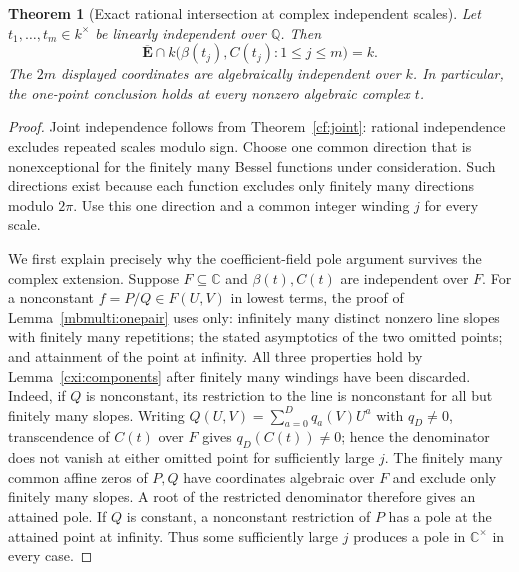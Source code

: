 \documentclass[11pt]{article}
\newtheorem{theorem}{Theorem}[section]
\theoremstyle{definition}
\theoremstyle{remark}
\newcommand{\Ebar}{\overline{\mathbf E}}
\begin{document}
\begin{theorem}[Exact rational intersection at complex independent scales]
\label{cxi:main}
Let $t_1,\ldots,t_m\in k^\times$ be linearly independent over
$\mathbb Q$.  Then
\[
 \boxed{\quad
 \Ebar\cap k\bigl(\beta(t_j),C(t_j):1\le j\le m\bigr)=k.
 \quad}
\]
The $2m$ displayed coordinates are algebraically independent over $k$.
In particular, the one-point conclusion holds at every nonzero
algebraic complex $t$.
\end{theorem}

\begin{proof}
Joint independence follows from Theorem~\ref{cf:joint}: rational
independence excludes repeated scales modulo sign.  Choose one common
direction that is nonexceptional for the finitely many Bessel functions
under consideration.  Such directions exist because each function
excludes only finitely many directions modulo $2\pi$.  Use this one
direction and a common integer winding $j$ for every scale.

We first explain precisely why the coefficient-field pole argument
survives the complex extension.  Suppose $F\subseteq\mathbb C$ and
$\beta(t),C(t)$ are independent over $F$.  For a nonconstant
$f=P/Q\in F(U,V)$ in lowest terms, the proof of
Lemma~\ref{mbmulti:onepair} uses only: infinitely many distinct nonzero
line slopes with finitely many repetitions; the stated asymptotics of
the two omitted points; and attainment of the point at infinity.
All three properties hold by Lemma~\ref{cxi:components} after finitely
many windings have been discarded.  Indeed, if $Q$ is nonconstant,
its restriction to the line is nonconstant for all but finitely many
slopes.  Writing $Q(U,V)=\sum_{a=0}^Dq_a(V)U^a$ with $q_D\ne0$,
transcendence of $C(t)$ over $F$ gives $q_D(C(t))\ne0$; hence the
denominator does not vanish at either omitted point for sufficiently
large $j$.  The finitely many common affine zeros of $P,Q$ have
coordinates algebraic over $F$ and exclude only finitely many slopes.
A root of the restricted denominator therefore gives an attained pole.
If $Q$ is constant, a nonconstant restriction of $P$ has a pole at
the attained point at infinity.  Thus some sufficiently large $j$
produces a pole in $\mathbb C^\times$ in every case.


\end{proof}
\end{document}
